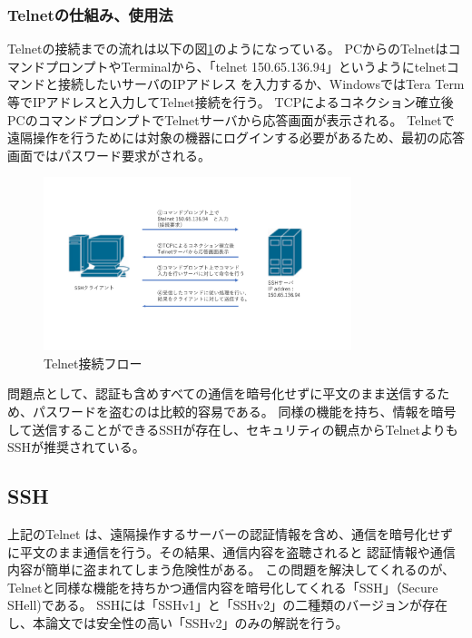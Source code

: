 \documentclass[12pt,a4paper,titlepage]{jsarticle}
\begin{document}
\subsubsection{Telnetの仕組み、使用法}
Telnetの接続までの流れは以下の図\ref{telnet_flow}のようになっている。
PCからのTelnetはコマンドプロンプトやTerminalから、「telnet 150.65.136.94」というようにtelnetコマンドと接続したいサーバのIPアドレス
を入力するか、WindowsではTera Term等でIPアドレスと入力してTelnet接続を行う。
TCPによるコネクション確立後PCのコマンドプロンプトでTelnetサーバから応答画面が表示される。
Telnetで遠隔操作を行うためには対象の機器にログインする必要があるため、最初の応答画面ではパスワード要求がされる。

\begin{figure}[H]
    \centering
    \includegraphics*[width=0.8\textwidth,page=1]{graphs/network_archtecture.pdf}
    \caption{Telnet接続フロー}
    \label{telnet_flow}
\end{figure}

問題点として、認証も含めすべての通信を暗号化せずに平文のまま送信するため、パスワードを盗むのは比較的容易である。
同様の機能を持ち、情報を暗号して送信することができるSSHが存在し、セキュリティの観点からTelnetよりもSSHが推奨されている。

\subsection{SSH}
上記のTelnet は、遠隔操作するサーバーの認証情報を含め、通信を暗号化せずに平文のまま通信を行う。その結果、通信内容を盗聴されると
認証情報や通信内容が簡単に盗まれてしまう危険性がある。
この問題を解決してくれるのが、Telnetと同様な機能を持ちかつ通信内容を暗号化してくれる「SSH」（Secure SHell)である。
SSHには「SSHv1」と「SSHv2」の二種類のバージョンが存在し、本論文では安全性の高い「SSHv2」のみの解説を行う。
\end{document}
